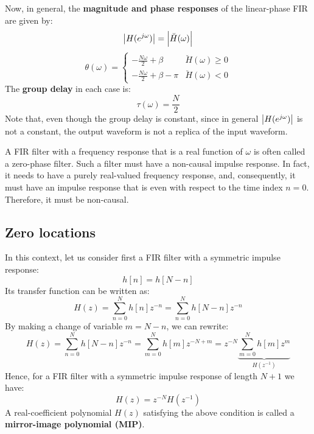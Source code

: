 \documentclass[../../main/main.tex]{subfiles}
\begin{document}
\medskip
Now, in general, the \textbf{magnitude and phase responses} of the linear-phase FIR are given by:%
%
\begin{equation}
    \abs{H(e^{j\omega})}
    =
    \abs{\breve{H}(\omega)}
    \label{eq:L20_S41_1}
\end{equation}
\begin{equation}
    \theta(\omega)
    =
    \begin{cases}
        - \frac{N\omega}{2} + \beta         &   \breve{H}(\omega) \ge 0 \\
        - \frac{N\omega}{2} + \beta - \pi   &   \breve{H}(\omega) <   0
    \end{cases}
    \label{eq:L20_S41_2}
\end{equation}
The \textbf{group delay} in each case is:%
%
\begin{equation}
    \tau(\omega)
    =
    \frac{N}{2}
    \label{eq:L20_S42_1}
\end{equation}
Note that, even though the group delay is constant, since in general \( \abs{H(e^{j\omega})} \) is not a constant, the output waveform is not a replica of the input waveform.

A FIR filter with a frequency response that is a real function of \( \omega \) is often called a zero-phase filter.
Such a filter must have a non-causal impulse response. In fact, it needs to have a purely real-valued frequency response, and, consequently, it must have an impulse response that is even with respect to the time index \( n = 0 \). Therefore, it must be non-causal.



\subsection{Zero locations}
In this context, let us consider first a FIR filter with a symmetric impulse response:
\begin{equation}
    h[n]
    =
    h[N-n]
    \label{eq:L20_S43_1}
\end{equation}
Its transfer function can be written as:
\begin{equation}
    H(z)
    =
    \sum_{n=0}^{N} h[n]z^{-n}
    =
    \sum_{n=0}^{N} h[N-n]z^{-n}
    \label{eq:L20_S43_2}
\end{equation}
By making a change of variable \( m = N - n \), we can rewrite:
\begin{equation}
    H(z)
    =
    \sum_{n=0}^{N} h[N-n]z^{-n}
    =
    \sum_{m=0}^{N} h[m]z^{-N+m}
    =
    z^{-N} \underbrace{\sum_{m=0}^{N} h[m]z^{m}}_{H(z^{-1})}
    \label{eq:L20_S43_3}
\end{equation}
Hence, for a FIR filter with a symmetric impulse response of length \( N + 1 \) we have:
\begin{equation}
    H(z)
    =
    z^{-N} H(z^{-1})
    \label{eq:L20_S44_2}
\end{equation}
%
A real-coefficient polynomial \( H(z) \) satisfying the above condition is called a \textbf{mirror-image polynomial (MIP)}.
\end{document}
